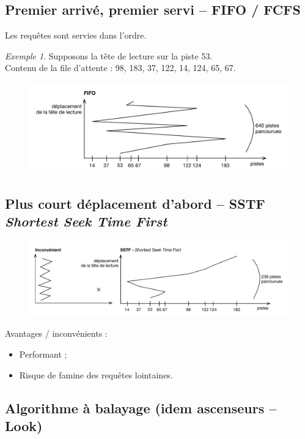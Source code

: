 \documentclass[11pt,english,french]{scrreprt}
\theoremstyle{remark}
\newtheorem*{ex*}{Exemple}
\theoremstyle{definition}
\newcommand*\Pitem{%
  \item[\color{green}\scalebox{0.9}{\textbullet}]}
\newcommand*\Citem{%
  \item[\color{red}\scalebox{0.9}{\textbullet}]}
\begin{document}
\subsection{Premier arrivé, premier servi -- FIFO / FCFS}
Les requêtes sont servies dans l'ordre.

\begin{ex*}
	Supposons la tête de lecture sur la piste 53.\\ 
	Contenu de la file d'attente : 98, 183, 37, 122, 14, 124, 65, 67.
\end{ex*}

\begin{figure}[h!]
	\center
	\vspace{-10pt}
	\includegraphics[scale=.85]{img/hd-FIFO}
\end{figure}

\subsection{Plus court déplacement d'abord -- SSTF \emph{Shortest Seek Time First}}

\begin{figure}[h!]
	\center
	\vspace{-10pt}
	\includegraphics[scale=.85]{img/hd-SSTF}
\end{figure}

Avantages / inconvénients :
\begin{itemize}
	\Pitem Performant ;
	\Citem Risque de famine des requêtes lointaines.
\end{itemize}

\subsection{Algorithme à balayage (idem ascenseurs -- Look)}
\end{document}
